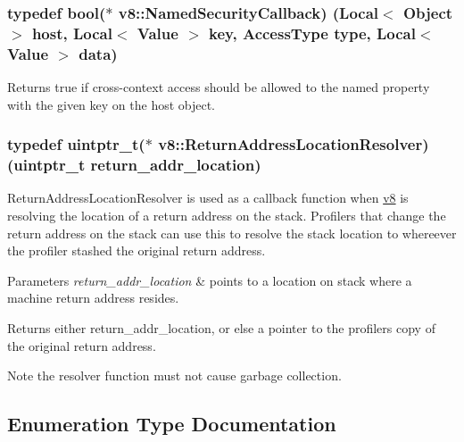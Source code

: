 \subsubsection[{\texorpdfstring{Named\+Security\+Callback}{NamedSecurityCallback}}]{\setlength{\rightskip}{0pt plus 5cm}typedef bool($\ast$ v8\+::\+Named\+Security\+Callback) ({\bf Local}$<$ {\bf Object} $>$ host, {\bf Local}$<$ {\bf Value} $>$ key, {\bf Access\+Type} type, {\bf Local}$<$ {\bf Value} $>$ data)}\hypertarget{namespacev8_ab5cafda0c556bba990c660ce9c904e0d}{}\label{namespacev8_ab5cafda0c556bba990c660ce9c904e0d}
Returns true if cross-\/context access should be allowed to the named property with the given key on the host object. 
\subsubsection[{\texorpdfstring{Return\+Address\+Location\+Resolver}{ReturnAddressLocationResolver}}]{\setlength{\rightskip}{0pt plus 5cm}typedef uintptr\+\_\+t($\ast$ v8\+::\+Return\+Address\+Location\+Resolver) (uintptr\+\_\+t return\+\_\+addr\+\_\+location)}\hypertarget{namespacev8_a8ce54c75241be41ff6a25e9944eefd2a}{}\label{namespacev8_a8ce54c75241be41ff6a25e9944eefd2a}
Return\+Address\+Location\+Resolver is used as a callback function when \hyperlink{namespacev8}{v8} is resolving the location of a return address on the stack. Profilers that change the return address on the stack can use this to resolve the stack location to whereever the profiler stashed the original return address.


\begin{DoxyParams}{Parameters}
{\em return\+\_\+addr\+\_\+location} & points to a location on stack where a machine return address resides. \\
\hline
\end{DoxyParams}
\begin{DoxyReturn}{Returns}
either return\+\_\+addr\+\_\+location, or else a pointer to the profiler\textquotesingle{}s copy of the original return address.
\end{DoxyReturn}
\begin{DoxyNote}{Note}
the resolver function must not cause garbage collection. 
\end{DoxyNote}


\subsection{Enumeration Type Documentation}
